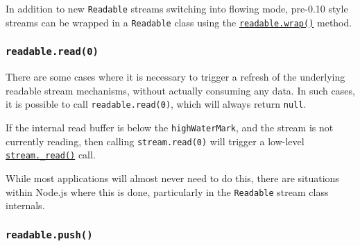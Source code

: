 \begin{Shaded}
\begin{Highlighting}[]
\KeywordTok{=\textgreater{}}\NormalTok{ \{}
\NormalTok{(}\OperatorTok{,}\NormalTok{ () }\KeywordTok{=\textgreater{}}\NormalTok{ \{}
\NormalTok{(}\StringTok{\textquotesingle{}}\NormalTok{)}\OperatorTok{;}
\NormalTok{  \})}\OperatorTok{;}

\NormalTok{()}\OperatorTok{;}
\NormalTok{\})}\NormalTok{(}\NormalTok{)}\OperatorTok{;}
\end{Highlighting}
\end{Shaded}

In addition to new \texttt{Readable} streams switching into flowing
mode, pre-0.10 style streams can be wrapped in a \texttt{Readable} class
using the \hyperref[readablewrapstream]{\texttt{readable.wrap()}}
method.

\subsubsection{\texorpdfstring{\texttt{readable.read(0)}}{readable.read(0)}}\label{readable.read0}

There are some cases where it is necessary to trigger a refresh of the
underlying readable stream mechanisms, without actually consuming any
data. In such cases, it is possible to call \texttt{readable.read(0)},
which will always return \texttt{null}.

If the internal read buffer is below the \texttt{highWaterMark}, and the
stream is not currently reading, then calling \texttt{stream.read(0)}
will trigger a low-level
\hyperref[readable_readsize]{\texttt{stream.\_read()}} call.

While most applications will almost never need to do this, there are
situations within Node.js where this is done, particularly in the
\texttt{Readable} stream class internals.

\subsubsection{\texorpdfstring{\texttt{readable.push(\textquotesingle{}\textquotesingle{})}}{readable.push(\textquotesingle\textquotesingle)}}\label{readable.push}

